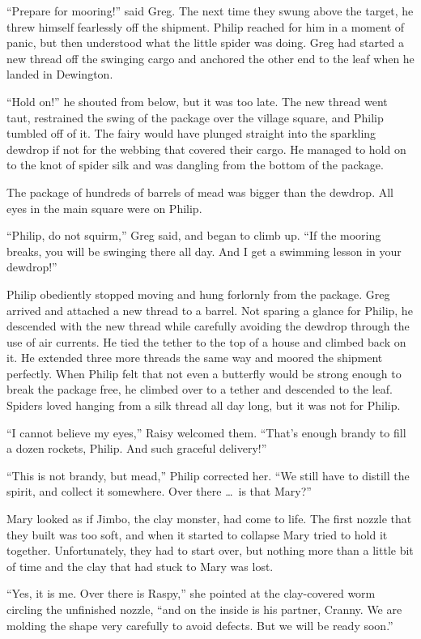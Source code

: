 \documentclass[10pt]{memoir}
\begin{document}
``Prepare for mooring!'' said Greg. The next time they swung above the target,
he threw himself fearlessly off the shipment. Philip reached for him in a
moment of panic, but then understood what the little spider was doing. Greg
had started a new thread off the swinging cargo and anchored the other end to
the leaf when he landed in Dewington.

``Hold on!'' he shouted from below, but it was too late. The new thread went
taut, restrained the swing of the package over the village square, and Philip
tumbled off of it. The fairy would have plunged straight into the sparkling
dewdrop if not for the webbing that covered their cargo. He managed to hold on
to the knot of spider silk and was dangling from the bottom of the package.

The package of hundreds of barrels of mead was bigger than the dewdrop. All
eyes in the main square were on Philip.

``Philip, do not squirm,'' Greg said, and began to climb up. ``If the mooring
breaks, you will be swinging there all day. And I get a swimming lesson in your
dewdrop!''

Philip obediently stopped moving and hung forlornly from the package. Greg
arrived and attached a new thread to a barrel. Not sparing a glance for
Philip, he descended with the new thread while carefully avoiding the dewdrop
through the use of air currents. He tied the tether to the top of a house and
climbed back on it. He extended three more threads the same way and moored the
shipment perfectly. When Philip felt that not even a butterfly would be strong
enough to break the package free, he climbed over to a tether and descended to
the leaf. Spiders loved hanging from a silk thread all day long, but it was not
for Philip.

``I cannot believe my eyes,'' Raisy welcomed them. ``That's enough brandy to
fill a dozen rockets, Philip. And such graceful delivery!''

``This is not brandy, but mead,'' Philip corrected her. ``We still have to
distill the spirit, and collect it somewhere. Over there \dots\ is that Mary?''

Mary looked as if Jimbo, the clay monster, had come to life. The first nozzle
that they built was too soft, and when it started to collapse Mary tried to
hold it together. Unfortunately, they had to start over, but nothing more than
a little bit of time and the clay that had stuck to Mary was lost.

``Yes, it is me. Over there is Raspy,'' she pointed at the clay-covered worm
circling the unfinished nozzle, ``and on the inside is his partner, Cranny. We
are molding the shape very carefully to avoid defects. But we will be ready
soon.''
\end{document}
